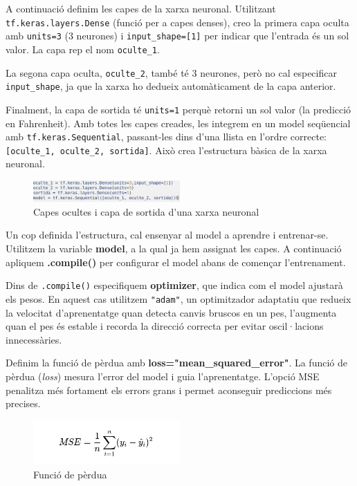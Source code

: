 A continuació definim les capes de la xarxa neuronal. Utilitzant \texttt{tf.keras.layers.Dense} (funció per a capes denses), creo la primera capa oculta amb \texttt{units=3} (3 neurones) i \texttt{input\_shape=[1]} per indicar que l’entrada és un sol valor. La capa rep el nom \texttt{oculte\_1}.

La segona capa oculta, \texttt{oculte\_2}, també té 3 neurones, però no cal especificar \texttt{input\_shape}, ja que la xarxa ho dedueix automàticament de la capa anterior.

Finalment, la capa de sortida té \texttt{units=1} perquè retorni un sol valor (la predicció en Fahrenheit). Amb totes les capes creades, les integrem en un model seqüencial amb \texttt{tf.keras.Sequential}, passant-les dins d’una llista en l’ordre correcte: \texttt{[oculte\_1, oculte\_2, sortida]}. Això crea l’estructura bàsica de la xarxa neuronal.

\begin{figure}[H]
\centering
\includegraphics[width=0.5\textwidth]{./figures/3.png}
\caption{Capes ocultes i capa de sortida d’una xarxa neuronal}
\end{figure}

Un cop definida l’estructura, cal ensenyar al model a aprendre i entrenar-se. Utilitzem la variable \textbf{model}, a la qual ja hem assignat les capes. A continuació apliquem \textbf{.compile()} per configurar el model abans de començar l’entrenament.

Dins de \texttt{.compile()} especifiquem \textbf{optimizer}, que indica com el model ajustarà els pesos. En aquest cas utilitzem \texttt{"adam"}, un optimitzador adaptatiu que redueix la velocitat d’aprenentatge quan detecta canvis bruscos en un pes, l’augmenta quan el pes és estable i recorda la direcció correcta per evitar oscil·lacions innecessàries.

Definim la funció de pèrdua amb \textbf{loss="mean\_squared\_error"}. La funció de pèrdua (\textit{loss}) mesura l’error del model i guia l’aprenentatge. L’opció MSE penalitza més fortament els errors grans i permet aconseguir prediccions més precises.

\begin{figure}[H]
\centering
\includegraphics[width=0.5\textwidth]{./figures/5.png}
\caption{Funció de pèrdua}
\end{figure}

